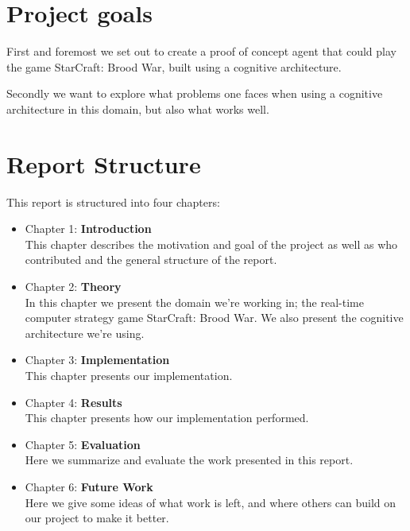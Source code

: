 \section{Project goals}
\label{sec:goals}
First and foremost we set out to create a proof of concept agent that could play the game StarCraft: Brood War, built using a cognitive architecture.

Secondly we want to explore what problems one faces when using a cognitive architecture in this domain, but also what works well.

\section{Report Structure}
\label{sec:structure}
This report is structured into four chapters:
\begin{itemize}
\item Chapter 1: \textbf{Introduction} \\
This chapter describes the motivation and goal of the project as well as who
contributed and the general structure of the report.
\item Chapter 2: \textbf{Theory} \\
In this chapter we present the domain we're working in; the real-time computer strategy game StarCraft: Brood War. We also present the cognitive architecture we're using.
\item Chapter 3: \textbf{Implementation} \\
This chapter presents our implementation.
\item Chapter 4: \textbf{Results} \\
This chapter presents how our implementation performed.
\item Chapter 5: \textbf{Evaluation} \\
Here we summarize and evaluate the work presented in this report.
\item Chapter 6: \textbf{Future Work} \\
Here we give some ideas of what work is left, and where others can build on our project to make it better.

\end{itemize}